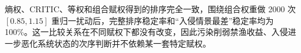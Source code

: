 熵权、CRITIC、等权和组合赋权得到的排序完全一致，围绕组合权重做 2000 次 $[0.85,1.15]$ 重归一扰动后，完整排序稳定率和“入侵情景最差”稳定率均为 100\%。这一比较关系在不同赋权下都没有改变，因此污染削弱禁渔收益、入侵进一步恶化系统状态的次序判断并不依赖某一套特定赋权。
